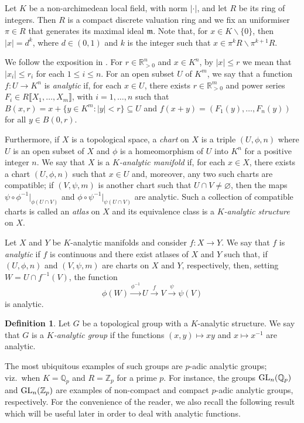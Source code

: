 \documentclass[a4paper,10pt]{amsart}
\theoremstyle{plain}
\theoremstyle{definition}
\newtheorem{definition}[thm]{Definition}
\newcommand{\bbQ}{\mathbb{Q}}
\newcommand{\bbZ}{\mathbb{Z}}
\numberwithin{equation}{section}
\begin{document}
Let $K$ be a non-archimedean local field, with norm $\lvert \cdot \rvert$, and let $R$ be its ring of integers. Then $R$ is a compact discrete valuation ring and we fix an uniformiser $\pi \in R$ that generates its maximal ideal $\mathfrak m$. Note that, for $x \in K\smallsetminus \{0\}$, then $|x| = d^{k}$, where $d \in (0,1)$ and $k$ is the integer such that $x \in \pi^{k}R\smallsetminus \pi^{k+1}R$.

We follow the exposition in \cite[Pt.~2]{Ser65}. For $r \in \mathbb R^n_{>0}$ and $x \in K^n$, by $|x| \leq r$ we mean that $|x_i|\leq r_i$ for each $1\leq i \leq n$. For an open subset $U$ of $K^{m}$, we say that a function $f : U \to K^{n}$ is \emph{analytic} if, for each $x \in U$, there exists $r \in \mathbb R_{>0}^m$ and power series $F_i \in R\llbracket X_1,\ldots,X_m \rrbracket$, with $i=1,\ldots,n$ such that $B(x,r)=x+\{y \in K^m : |y| < r\} \subseteq U$ and $f(x+y) = (F_1(y),\ldots,F_n(y))$ for all $y \in B(0,r)$.

Furthermore, if $X$ is a topological space, a \emph{chart} on $X$ is a triple $(U,\phi,n)$ where $U$ is an open subset of $X$ and $\phi$ is a homeomorphism of $U$ into $K^{n}$ for a positive integer $n$. We say that $X$ is a \emph{$K$-analytic manifold} if, for each $x \in X$, there exists a chart $(U,\phi,n)$ such that $x \in U$ and, moreover, any two such charts are compatible; if $(V,\psi, m)$ is another chart such that $U \cap V \neq \varnothing$, then the maps $\psi \circ \phi^{-1}|_{\phi(U\cap V)}$ and $\phi \circ \psi^{-1}|_{\psi(U\cap V)}$ are analytic. Such a collection of compatible charts is called an \emph{atlas} on $X$ and its equivalence class is a \emph{$K$-analytic structure} on $X$.

Let $X$ and $Y$ be $K$-analytic manifolds and consider $f \colon X \to Y$. We say that $f$ is \emph{analytic} if $f$ is continuous and there exist atlases of $X$ and $Y$ such that, if $(U,\phi,n)$ and $(V,\psi,m)$ are charts on $X$ and $Y$, respectively, then, setting $W=U \cap f^{-1}(V)$, the function
\[\phi(W) \overset{\phi^{-1}}{\longrightarrow} U \overset{f}{\longrightarrow} V \overset{\psi}{\longrightarrow} \psi(V)\]
is analytic. 

\begin{definition}
    Let $G$ be a topological group with a $K$-analytic structure. We say that $G$ is a \emph{$K$-analytic group} if the functions $(x,y) \mapsto xy$ and $x \mapsto x^{-1}$ are analytic.
\end{definition}

The most ubiquitous examples of such groups are $p$-adic analytic groups; viz.\ when $K=\bbQ_p$ and $R=\bbZ_p$ for a prime $p$. For instance, the groups ${\rm{GL}}_n(\bbQ_p)$ and ${\rm{GL}}_n(\bbZ_p)$ are examples of non-compact and compact $p$-adic analytic groups, respectively. For the convenience of the reader, we also recall the following result which will be useful later in order to deal with analytic functions.
\end{document}
